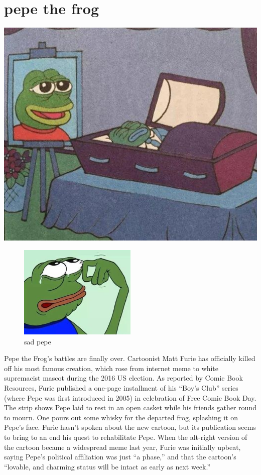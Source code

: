 
\section{pepe the frog}
\begin{center}
\includegraphics[width=.5\textwidth]{frog/image/frog2.jpg}
\end{center}
\begin{figure}[h]
\begin{center}
\includegraphics[width=0.5\textwidth]{frog/image/frog.jpg} %
\caption{sad pepe}
\label{figurezzzz}
\end{center}
\end{figure}


Pepe the Frog’s battles are finally over. Cartoonist Matt Furie has officially killed off his most famous creation, which rose from internet meme to white supremacist mascot during the 2016 US election. As reported by Comic Book Resources, Furie published a one-page installment of his “Boy’s Club” series (where Pepe was first introduced in 2005) in celebration of Free Comic Book Day. The strip shows Pepe laid to rest in an open casket while his friends gather round to mourn. One pours out some whisky for the departed frog, splashing it on Pepe’s face. 
Furie hasn’t spoken about the new cartoon, but its publication seems to bring to an end his quest to rehabilitate Pepe. When the alt-right version of the cartoon became a widespread meme last year, Furie was initially upbeat, saying Pepe’s political affiliation was just “a phase,” and that the cartoon’s “lovable, and charming status will be intact as early as next week.” 
